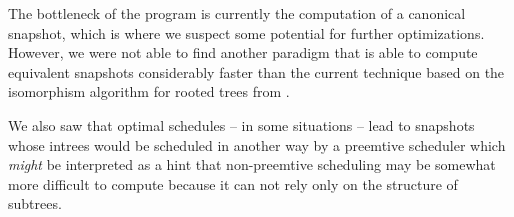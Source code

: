 The bottleneck of the program is currently the computation of a canonical snapshot, which is where we suspect some potential for further optimizations. However, we were not able to find another paradigm that is able to compute equivalent snapshots considerably faster than the current technique based on the isomorphism algorithm for rooted trees from \cite{aho1974design}.

We also saw that optimal schedules -- in some situations -- lead to snapshots whose intrees would be scheduled in another way by a preemtive scheduler which \emph{might} be interpreted as a hint that non-preemtive scheduling may be somewhat more difficult to compute because it can not rely only on the structure of subtrees.

